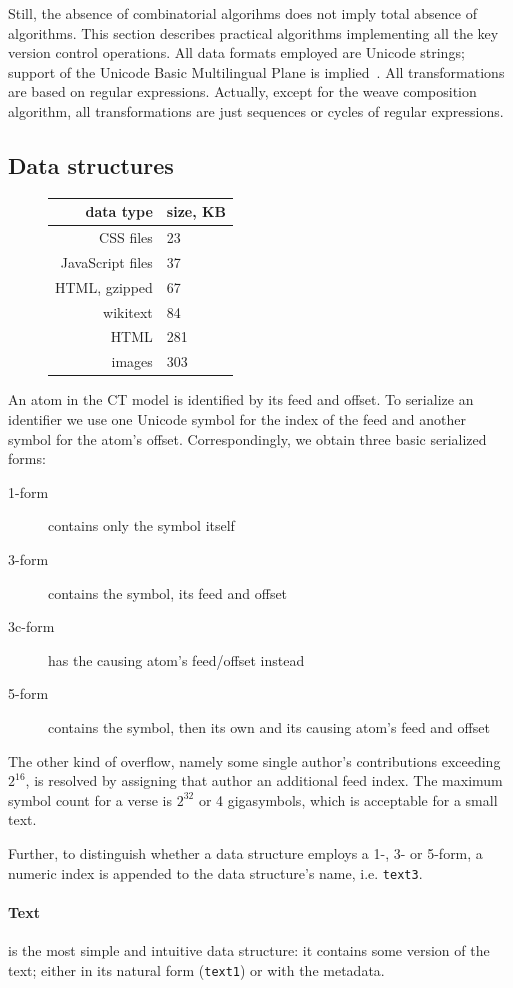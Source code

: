 \documentclass{acm_proc_article-sp}
\begin{document}
Still, the absence of combinatorial algorihms does not imply total absence of algorithms. This section describes practical algorithms implementing all the key version control operations.
All data formats employed are Unicode strings; support of the Unicode Basic Multilingual Plane is implied~\cite{unicode}. All transformations are based on regular expressions. Actually, except for the weave composition algorithm, all transformations are just sequences or cycles of regular expressions.

\subsection{Data structures}
\begin{figure}
\begin{tabular}{r|l}
data type & size, KB \\
\hline
CSS files & 23 \\
JavaScript files & 37 \\
HTML, gzipped & 67 \\
wikitext & 84 \\
HTML & 281 \\
images & 303 
\end{tabular}
\end{figure}
An atom in the CT model is identified by its feed and offset. To serialize an identifier we use one Unicode symbol for the index of the feed and another symbol for the atom's offset.
Correspondingly, we obtain three basic serialized forms:
\begin{description}
\item[1-form] contains only the symbol itself
\item[3-form] contains the symbol, its feed and offset
\item[3c-form] has the causing atom's feed/offset instead
\item[5-form] contains the symbol, then its own and its causing atom's feed and offset
\end{description}
The other kind of overflow, namely some single author's contributions exceeding $2^{16}$, is resolved by assigning that author an additional feed index. The maximum symbol count for a verse is $2^{32}$ or 4 gigasymbols, which is acceptable for a small text.

Further, to distinguish whether a data structure employs a 1-, 3- or 5-form, a numeric index is appended to the data structure's name, i.e. {\tt text3}.

\paragraph{Text} is the most simple and intuitive data structure: it contains some version of the text; either in its natural form ({\tt text1}) or with the metadata.
\end{document}
